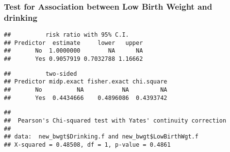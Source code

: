 \documentclass[
]{article}
\newenvironment{Shaded}{\begin{snugshade}}{\end{snugshade}}
\newcommand{\AttributeTok}[1]{\textcolor[rgb]{0.77,0.63,0.00}{#1}}
\newcommand{\CommentTok}[1]{\textcolor[rgb]{0.56,0.35,0.01}{\textit{#1}}}
\newcommand{\FunctionTok}[1]{\textcolor[rgb]{0.00,0.00,0.00}{#1}}
\newcommand{\NormalTok}[1]{#1}
\newcommand{\OtherTok}[1]{\textcolor[rgb]{0.56,0.35,0.01}{#1}}
\newcommand{\SpecialCharTok}[1]{\textcolor[rgb]{0.00,0.00,0.00}{#1}}
\begin{document}
\vspace{1 in}

\hypertarget{test-for-association-between-low-birth-weight-and-drinking}{%
\subsubsection{Test for Association between Low Birth Weight and
drinking}\label{test-for-association-between-low-birth-weight-and-drinking}}

\begin{Shaded}
\end{Shaded}

\begin{verbatim}
##          risk ratio with 95% C.I.
## Predictor  estimate     lower   upper
##       No  1.0000000        NA      NA
##       Yes 0.9057919 0.7032788 1.16662
\end{verbatim}

\begin{Shaded}
\end{Shaded}

\begin{verbatim}
##          two-sided
## Predictor midp.exact fisher.exact chi.square
##       No          NA           NA         NA
##       Yes  0.4434666    0.4896086  0.4393742
\end{verbatim}

\begin{Shaded}
\end{Shaded}

\begin{verbatim}
## 
##  Pearson's Chi-squared test with Yates' continuity correction
## 
## data:  new_bwgt$Drinking.f and new_bwgt$LowBirthWgt.f
## X-squared = 0.48508, df = 1, p-value = 0.4861
\end{verbatim}
\end{document}
